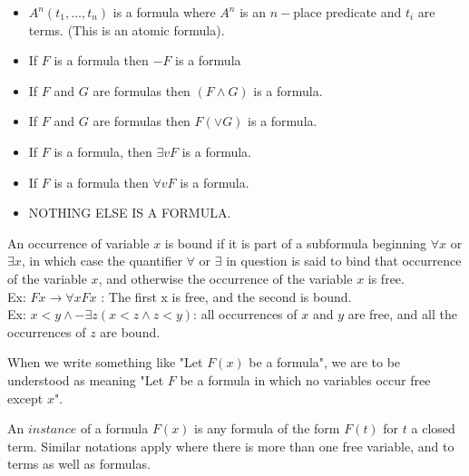 \begin{definition}[Formula]
\begin{itemize}
\item $A^n(t_1,\dots,t_n)$ is a formula where $A^n$ is an $n-$place predicate and $t_i$ are terms. (This is an atomic formula).
\item If $F$ is a formula then $-F$ is a formula
\item If $F$ and $G$ are formulas then $(F\wedge G)$ is a formula.
\item If $F$ and $G$ are formulas then $F(\vee G)$ is a formula.
\item If $F$ is a formula, then $\exists vF$ is a formula.
\item If $F$ is a formula then $\forall vF$ is a formula.
\item NOTHING ELSE IS A FORMULA.
\end{itemize}
\end{definition}


\begin{definition}[Bound]

An occurrence of variable $x$ is bound if it is part of a subformula beginning $\forall x$ or $\exists x$, in which case the quantifier $\forall$ or $\exists$ in question is said to bind that occurrence of the variable $x$, and otherwise the occurrence of the variable $x$ is free. \\
Ex: $Fx \rightarrow \forall x F x$ : The first x is free, and the second is bound. \\
Ex: $x < y \wedge - \exists z ( x < z \wedge z < y )$: all occurrences of $x$ and $y$ are free, and all the occurrences of $z$ are bound.
\end{definition}

\begin{remark}
When we write something like "Let $F(x)$ be a formula", we are to be understood as meaning "Let $F$ be a formula in which no variables occur free except $x$".
\end{remark}

\begin{definition}[Instance]
An $instance$ of a formula $F(x)$ is any formula of the form $F(t)$ for $t$ a closed term. Similar notations apply where there is more than one free variable, and to terms as well as formulas.
\end{definition}


